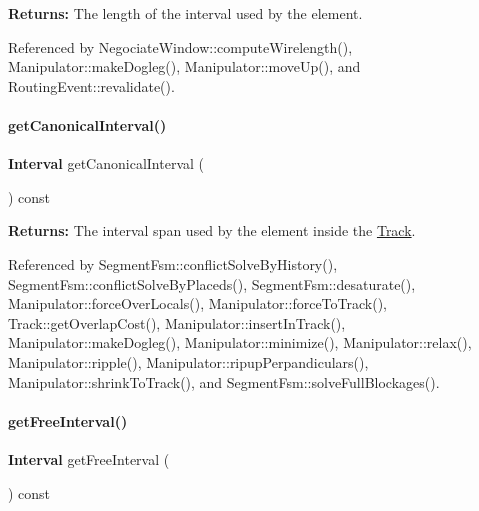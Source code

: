 {\bfseries Returns\+:} The length of the interval used by the element. 

Referenced by Negociate\+Window\+::compute\+Wirelength(), Manipulator\+::make\+Dogleg(), Manipulator\+::move\+Up(), and Routing\+Event\+::revalidate().

\mbox{\label{classKite_1_1TrackElement_ae96c050b96eaea51a3821cc01a1f3334}} 
\paragraph{\texorpdfstring{get\+Canonical\+Interval()}{getCanonicalInterval()}}
{\footnotesize\ttfamily \textbf{ Interval} get\+Canonical\+Interval (\begin{DoxyParamCaption}{ }\end{DoxyParamCaption}) const\hspace{0.3cm}{\ttfamily [inline]}}

{\bfseries Returns\+:} The interval span used by the element inside the \mbox{\hyperlink{classKite_1_1Track}{Track}}. 

Referenced by Segment\+Fsm\+::conflict\+Solve\+By\+History(), Segment\+Fsm\+::conflict\+Solve\+By\+Placeds(), Segment\+Fsm\+::desaturate(), Manipulator\+::force\+Over\+Locals(), Manipulator\+::force\+To\+Track(), Track\+::get\+Overlap\+Cost(), Manipulator\+::insert\+In\+Track(), Manipulator\+::make\+Dogleg(), Manipulator\+::minimize(), Manipulator\+::relax(), Manipulator\+::ripple(), Manipulator\+::ripup\+Perpandiculars(), Manipulator\+::shrink\+To\+Track(), and Segment\+Fsm\+::solve\+Full\+Blockages().

\mbox{\label{classKite_1_1TrackElement_a034711e2d3617ea848ef9f5a18255e10}} 
\paragraph{\texorpdfstring{get\+Free\+Interval()}{getFreeInterval()}}
{\footnotesize\ttfamily \textbf{ Interval} get\+Free\+Interval (\begin{DoxyParamCaption}{ }\end{DoxyParamCaption}) const\hspace{0.3cm}{\ttfamily [virtual]}}

